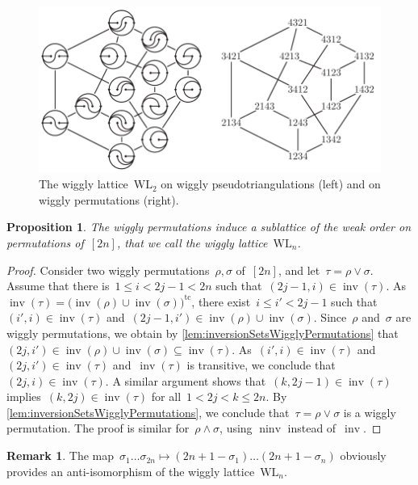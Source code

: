 \documentclass{amsart}
\newtheorem{proposition}[theorem]{Proposition}
\theoremstyle{definition}
\newtheorem{remark}[theorem]{Remark}
\DeclareMathOperator{\inv}{inv} %
\DeclareMathOperator{\ninv}{ninv} %
\newcommand{\darkblue}{\color{darkblue}} %
\newcommand{\defn}[1]{\textsl{\darkblue #1}} %
\newcommand{\meet}{\wedge} %
\newcommand{\join}{\vee} %
\newcommand{\wigglyLattice}{\mathrm{WL}} %
\begin{document}
%
\begin{figure}
\centerline{\includegraphics[scale=1.1]{wigglyLattice}}
\caption{The wiggly lattice~$\wigglyLattice_2$ on wiggly pseudotriangulations (left) and on wiggly permutations (right).}
\label{fig:wigglyLattice}
\end{figure}

\begin{proposition}
The wiggly permutations induce a sublattice of the weak order on permutations of~$[2n]$, that we call the \defn{wiggly lattice}~$\wigglyLattice_n$.
\end{proposition}

\pagebreak
\begin{proof}
Consider two wiggly permutations~$\rho, \sigma$ of~$[2n]$, and let~$\tau = \rho \join \sigma$.
Assume that there is~$1 \le i < 2j-1 < 2n$ such that~$(2j-1, i) \in \inv(\tau)$.
As $\inv(\tau) = \big( \inv(\rho) \cup \inv(\sigma) \big)^\textrm{tc}$, there exist~$i \le i' < 2j-1$ such that~$(i', i) \in \inv(\tau)$ and~$(2j-1, i') \in \inv(\rho) \cup \inv(\sigma)$.
Since~$\rho$ and~$\sigma$ are wiggly permutations, we obtain by \cref{lem:inversionSetsWigglyPermutations} that~$(2j, i') \in \inv(\rho) \cup \inv(\sigma) \subseteq \inv(\tau)$.
As~$(i', i) \in \inv(\tau)$ and~$(2j, i') \in \inv(\tau)$ and~$\inv(\tau)$ is transitive, we conclude that~$(2j,i) \in \inv(\tau)$.
A similar argument shows that~$(k, 2j-1) \in \inv(\tau)$ implies~$(k, 2j) \in \inv(\tau)$ for all~$1 < 2j < k \le 2n$.
By \cref{lem:inversionSetsWigglyPermutations}, we conclude that~$\tau = \rho \join \sigma$ is a wiggly permutation.
The proof is similar for~$\rho \meet \sigma$, using $\ninv$ instead of~$\inv$.
\end{proof}

\begin{remark}
\label{rem:wigglyLatticeAntiIsomorphism}
The map~$\sigma_1 \dots \sigma_{2n} \mapsto (2n+1-\sigma_1) \dots (2n+1-\sigma_n)$ obviously provides an anti-isomorphism of the wiggly lattice~$\wigglyLattice_n$.
\end{remark}
\end{document}
